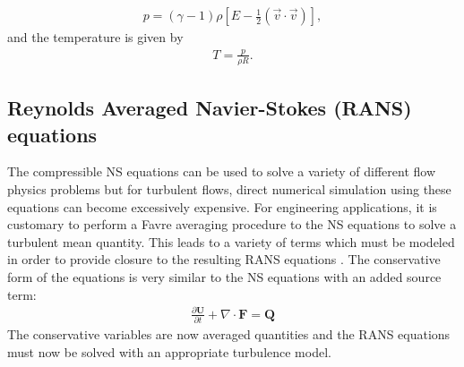 \begin{align} 
\label{constitutive}
p = (\gamma-1) \rho \left [ E - \frac{1}{2} (\vec{v} \cdot \vec{v} ) \right ],
\end{align}
 and the temperature is given by
\begin{align} 
\label{enthalpy}
T = \frac{p}{\rho R}.
\end{align}

\subsection{Reynolds Averaged Navier-Stokes (RANS) equations}
The compressible NS equations can be used to solve a variety of different flow physics problems but for turbulent flows, direct numerical simulation using these equations can become excessively expensive. For engineering applications, it is customary to perform a Favre averaging procedure to the NS equations to solve a turbulent mean quantity. This leads to a variety of terms which must be modeled in order to provide closure to the resulting RANS equations \cite{wilcox1998turbulence,oliver2008high}. The conservative form of the equations is very similar to the NS equations with an added source term:
\begin{align}
	\frac{\partial \boldsymbol{U}}{\partial t} + \nabla \cdot \boldsymbol{F} = \boldsymbol{Q}
\end{align}
The conservative variables are now averaged quantities and the RANS equations must now be solved with an appropriate turbulence model.
